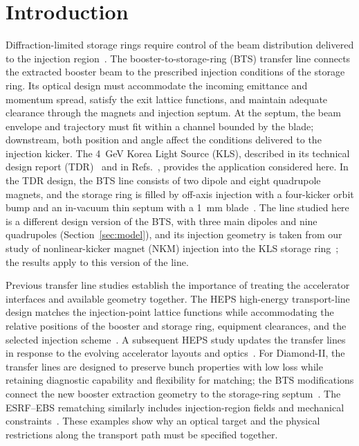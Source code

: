 \documentclass[final,5p,twocolumn]{elsarticle}
\begin{document}
\section{Introduction}
Diffraction-limited storage rings require control of the beam distribution delivered
to the injection region~\cite{Hettel2014}. The booster-to-storage-ring (BTS)
transfer line connects the extracted booster beam to the prescribed injection
conditions of the storage ring. Its optical design must accommodate the incoming
emittance and momentum spread, satisfy the exit lattice functions, and maintain
adequate clearance through the magnets and injection septum. At the septum, the
beam envelope and trajectory must fit within a channel bounded by the blade;
downstream, both position and angle affect the conditions delivered to the
injection kicker. The \SI{4}{\giga\electronvolt} Korea Light Source (KLS),
described in its technical design report (TDR)~\cite{KLSTDR2025} and in
Refs.~\cite{Kim2025,Lee2024}, provides the application considered here. In the TDR
design, the BTS line consists of two dipole and eight quadrupole magnets, and the
storage ring is filled by off-axis injection with a four-kicker orbit bump and an
in-vacuum thin septum with a \SI{1}{\milli\metre} blade~\cite{KLSTDR2025}. The line
studied here is a different design version of the BTS, with three main dipoles and
nine quadrupoles (Section~\ref{sec:model}), and its injection geometry is taken from
our study of nonlinear-kicker magnet (NKM) injection into the KLS storage
ring~\cite{ParkNKM2026}; the results apply to this version of the line.

Previous transfer line studies establish the importance of treating the
accelerator interfaces and available geometry together. The HEPS high-energy
transport-line design matches the injection-point lattice functions while
accommodating the relative positions of the booster and storage ring, equipment
clearances, and the selected injection scheme~\cite{Guo2017}. A subsequent HEPS
study updates the transfer lines in response to the evolving accelerator layouts
and optics~\cite{Guo2020}. For Diamond-II, the transfer lines are designed to
preserve bunch properties with low loss while retaining diagnostic capability
and flexibility for matching; the BTS modifications connect the new booster
extraction geometry to the storage-ring septum~\cite{Martin2022}. The ESRF--EBS
rematching similarly includes injection-region fields and mechanical
constraints~\cite{ESRF2018}. These examples show why an optical target and the
physical restrictions along the transport path must be specified together.
\end{document}
